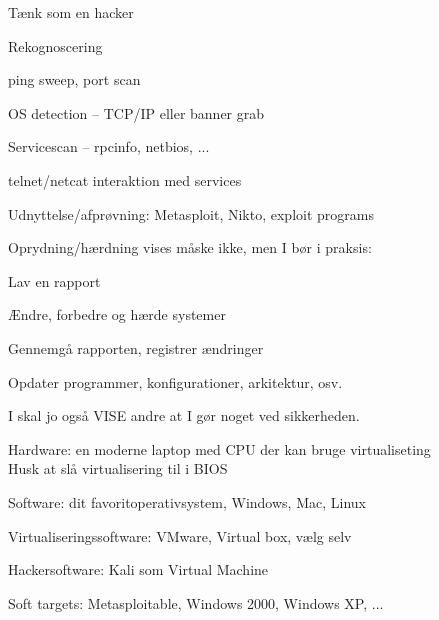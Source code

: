 \documentclass[20pt,landscape,a4paper,footrule]{foils}
\begin{document}





\begin{list1}
\item Tænk som en hacker
\item Rekognoscering
\begin{list2}
\item ping sweep, port scan
\item OS detection -- TCP/IP eller banner grab
\item Servicescan -- rpcinfo, netbios, ...
\item telnet/netcat interaktion med services
\end{list2}
\item Udnyttelse/afprøvning: Metasploit, Nikto, exploit programs
\item Oprydning/hærdning vises måske ikke, men I bør i praksis:
\begin{list2}
\item Lav en rapport
\item Ændre, forbedre og hærde systemer
\item Gennemgå rapporten, registrer ændringer
\item Opdater programmer, konfigurationer, arkitektur, osv.
\end{list2}
\item I skal jo også VISE andre at I gør noget ved sikkerheden.
\end{list1}




\begin{list2}
\item Hardware: en moderne laptop med CPU der kan bruge virtualiseting\\
Husk at slå virtualisering til i BIOS
\item Software: dit favoritoperativsystem, Windows, Mac, Linux
\item Virtualiseringssoftware: VMware, Virtual box, vælg selv
\item Hackersoftware: Kali som Virtual Machine 
\item Soft targets: Metasploitable, Windows 2000, Windows XP, ...
\end{list2}
\end{document}
